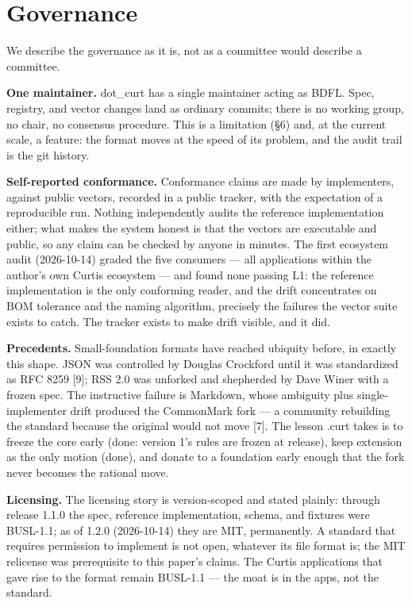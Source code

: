 \documentclass[11pt]{article}
\begin{document}
\section{Governance}

We describe the governance as it is, not as a committee would describe a committee.

\textbf{One maintainer.} dot\_curt has a single maintainer acting as BDFL. Spec, registry, and vector changes land as ordinary commits; there is no working group, no chair, no consensus procedure. This is a limitation (\S6) and, at the current scale, a feature: the format moves at the speed of its problem, and the audit trail is the git history.

\textbf{Self-reported conformance.} Conformance claims are made by implementers, against public vectors, recorded in a public tracker, with the expectation of a reproducible run. Nothing independently audits the reference implementation either; what makes the system honest is that the vectors are executable and public, so any claim can be checked by anyone in minutes. The first ecosystem audit (2026-10-14) graded the five consumers --- all applications within the author's own Curtis ecosystem --- and found none passing L1: the reference implementation is the only conforming reader, and the drift concentrates on BOM tolerance and the naming algorithm, precisely the failures the vector suite exists to catch. The tracker exists to make drift visible, and it did.

\textbf{Precedents.} Small-foundation formats have reached ubiquity before, in exactly this shape. JSON was controlled by Douglas Crockford until it was standardized as RFC 8259 [9]; RSS 2.0 was unforked and shepherded by Dave Winer with a frozen spec. The instructive failure is Markdown, whose ambiguity plus single-implementer drift produced the CommonMark fork --- a community rebuilding the standard because the original would not move [7]. The lesson .curt takes is to freeze the core early (done: version 1's rules are frozen at release), keep extension as the only motion (done), and donate to a foundation early enough that the fork never becomes the rational move.

\textbf{Licensing.} The licensing story is version-scoped and stated plainly: through release 1.1.0 the spec, reference implementation, schema, and fixtures were BUSL-1.1; as of 1.2.0 (2026-10-14) they are MIT, permanently. A standard that requires permission to implement is not open, whatever its file format is; the MIT relicense was prerequisite to this paper's claims. The Curtis applications that gave rise to the format remain BUSL-1.1 --- the moat is in the apps, not the standard.
\end{document}
